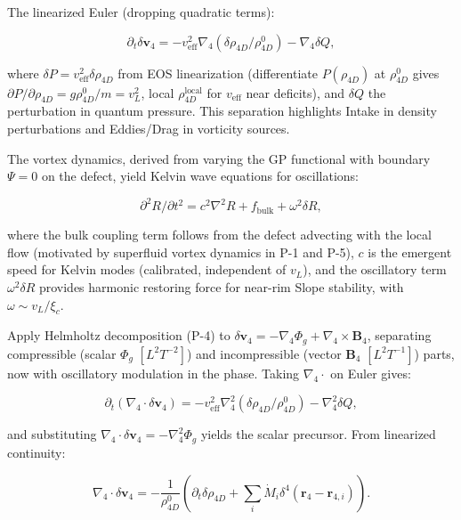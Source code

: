 The linearized Euler (dropping quadratic terms):

\begin{equation}
\partial_t \delta \mathbf{v}_4 = -v_{\text{eff}}^2 \nabla_4 (\delta \rho_{4D} / \rho_{4D}^0) - \nabla_4 \delta Q,
\end{equation}

where $\delta P = v_{\text{eff}}^2 \delta \rho_{4D}$ from EOS linearization (differentiate $P(\rho_{4D})$ at $\rho_{4D}^0$ gives $\partial P / \partial \rho_{4D} = g \rho_{4D}^0 / m = v_L^2$, local $\rho_{4D}^{\text{local}}$ for $v_{\text{eff}}$ near deficits), and $\delta Q$ the perturbation in quantum pressure. This separation highlights Intake in density perturbations and Eddies/Drag in vorticity sources.

The vortex dynamics, derived from varying the GP functional with boundary $\Psi=0$ on the defect, yield Kelvin wave equations for oscillations:

\begin{equation}
\partial^2 R / \partial t^2 = c^2 \nabla^2 R + f_{\text{bulk}} + \omega^2 \delta R,
\end{equation}

where the bulk coupling term follows from the defect advecting with the local flow (motivated by superfluid vortex dynamics in P-1 and P-5), $c$ is the emergent speed for Kelvin modes (calibrated, independent of $v_L$), and the oscillatory term $\omega^2 \delta R$ provides harmonic restoring force for near-rim Slope stability, with $\omega \sim v_L / \xi_c$.

Apply Helmholtz decomposition (P-4) to $\delta \mathbf{v}_4 = -\nabla_4 \Phi_g + \nabla_4 \times \mathbf{B}_4$, separating compressible (scalar $\Phi_g$ $[L^2 T^{-2}]$) and incompressible (vector $\mathbf{B}_4$ $[L^2 T^{-1}]$) parts, now with oscillatory modulation in the phase. Taking $\nabla_4 \cdot$ on Euler gives:

\begin{equation}
\partial_t (\nabla_4 \cdot \delta \mathbf{v}_4) = -v_{\text{eff}}^2 \nabla_4^2 (\delta \rho_{4D} / \rho_{4D}^0) - \nabla_4^2 \delta Q,
\end{equation}

and substituting $\nabla_4 \cdot \delta \mathbf{v}_4 = -\nabla_4^2 \Phi_g$ yields the scalar precursor. From linearized continuity:

\begin{equation}
\nabla_4 \cdot \delta \mathbf{v}_4 = -\frac{1}{\rho_{4D}^0} \left( \partial_t \delta \rho_{4D} + \sum_i \dot{M}_i \delta^4(\mathbf{r}_4 - \mathbf{r}_{4,i}) \right).
\end{equation}

